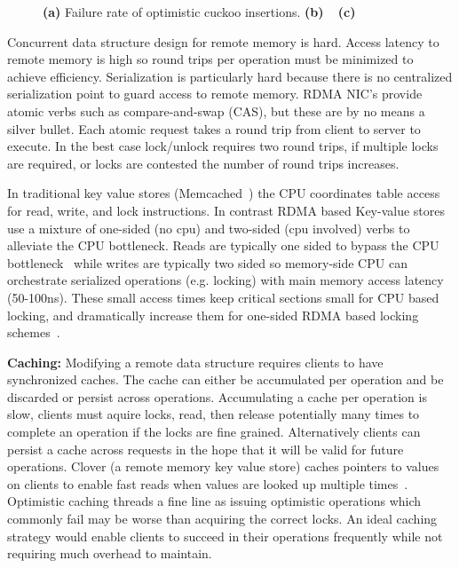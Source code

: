 \begin{figure}[t]
\begin{subfigure}{0.3\linewidth}
    \end{subfigure}
    \vspace{-1em}
    \caption{
    \textbf{(a)} Failure rate of optimistic cuckoo insertions.
    \textbf{(b)} ~
    \textbf{(c)} ~
    }
    \label{fig:problems}
\end{figure}

Concurrent data structure design for remote memory is hard.
Access latency to remote memory is high so round trips per
operation must be minimized to achieve efficiency.
Serialization is particularly hard because there is no
centralized serialization point to guard access to remote
memory. RDMA NIC's provide atomic verbs such as
compare-and-swap (CAS), but these are by no means a silver
bullet.  Each atomic request takes a round trip from client
to server to execute. In the best case lock/unlock requires
two round trips, if multiple locks are required, or locks
are contested the number of round trips increases.

In traditional key value stores (Memcached~\cite{memcached})
the CPU coordinates table access for read, write, and lock
instructions. In contrast RDMA based Key-value
stores~\cite{herd,erpc,pilaf} use a mixture of one-sided (no
cpu) and two-sided (cpu involved) verbs to alleviate the CPU
bottleneck. Reads are typically one sided to bypass the CPU
bottleneck~\cite{pilaf,cell} while writes are typically two
sided so memory-side CPU can orchestrate serialized
operations (e.g. locking) with main memory access latency
(50-100ns).  These small access times keep critical sections
small for CPU based locking, and dramatically increase them
for one-sided RDMA based locking schemes~\cite{clover,
sherman}.

\textbf{Caching:} Modifying a remote data structure requires
clients to have synchronized caches. The cache can either be
accumulated per operation and be discarded or persist across
operations.  Accumulating a cache per operation is slow,
clients must aquire locks, read, then release potentially
many times to complete an operation if the locks are fine
grained. Alternatively clients can persist a cache across
requests in the hope that it will be valid for future
operations.  Clover (a remote memory key value store) caches
pointers to values on clients to enable fast reads when
values are looked up multiple times~\cite{clover}.
Optimistic caching threads a fine line as issuing optimistic
operations which commonly fail may be worse than acquiring
the correct locks.  An ideal caching strategy would enable
clients to succeed in their operations frequently while not
requiring much overhead to maintain. 



